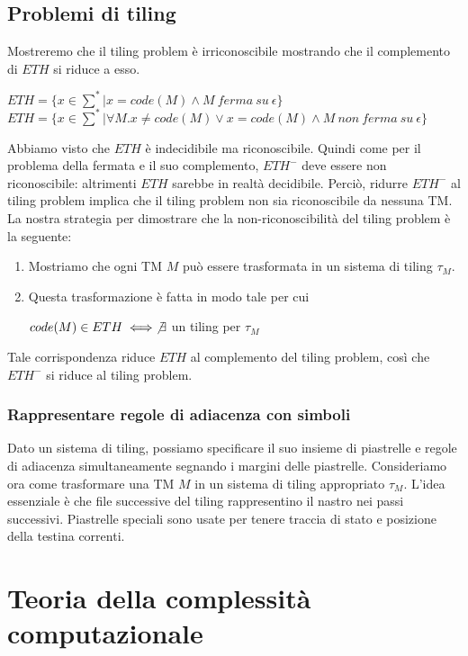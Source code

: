 \documentclass[a4paper, 12pt]{article}
\begin{document}
\subsection{Problemi di tiling}
Mostreremo che il tiling problem \`e irriconoscibile mostrando che il complemento di $ETH$ si riduce a esso.
\begin{center}
$ETH = \{x \in \sum^{*} | x = code(M) \land M\ ferma\ su\ \epsilon\}$\\
$ETH = \{x \in \sum^{*} | \forall M.x \neq code(M) \lor x = code(M) \land M\ non\ ferma\ su\ \epsilon\}$
\end{center}
Abbiamo visto che $ETH$ \`e indecidibile ma riconoscibile. Quindi come per il problema della fermata e il suo complemento, $ETH^{-}$ deve essere non riconoscibile: altrimenti $ETH$ sarebbe in realt\`a decidibile. Perci\`o, ridurre $ETH^{-}$ al tiling problem implica che il tiling problem non sia riconoscibile da nessuna TM.
La nostra strategia per dimostrare che la non-riconoscibilit\`a  del tiling problem \`e la seguente:
\begin{enumerate}
\item Mostriamo che ogni TM $M$ pu\`o essere trasformata in un sistema di tiling $\tau_{M}$.
\item Questa trasformazione \`e fatta in modo tale per cui \begin{center}
$code(M) \in ETH \iff \not\exists$ un tiling per $\tau_{M}$
\end{center}
\end{enumerate}
Tale corrispondenza riduce $ETH$ al complemento del tiling problem, cos\`i che $ETH^{-}$ si riduce al tiling problem.
\subsubsection{Rappresentare regole di adiacenza con simboli}
Dato un sistema di tiling, possiamo specificare il suo insieme di piastrelle e regole di adiacenza simultaneamente segnando i margini delle piastrelle.
Consideriamo ora come trasformare una TM $M$ in un sistema di tiling appropriato $\tau_{M}$. L’idea essenziale è che file successive del tiling
rappresentino il nastro nei passi successivi. Piastrelle speciali sono usate per tenere traccia di stato e posizione della testina correnti.
\newpage
\section{Teoria della complessit\`a computazionale}
\end{document}
